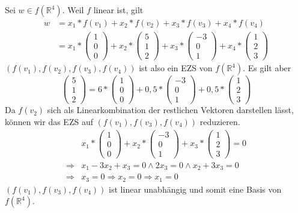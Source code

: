 \documentclass[a4paper,10pt]{article}
\begin{document}
Sei $w \in f(\mathbb{R}^4)$.
Weil $f$ linear ist, gilt
\begin{align}
 w & = x_1 * f(v_1) + x_2 * f(v_2) + x_3 * f(v_3) + x_4 * f(v_4)\\
 & =
   x_1 * \begin{pmatrix}1\\0\\0\end{pmatrix} +
   x_2 * \begin{pmatrix}5\\1\\2\end{pmatrix} +
   x_3 * \begin{pmatrix}-3\\0\\1\end{pmatrix} +
   x_4 * \begin{pmatrix}1\\2\\3\end{pmatrix}
\end{align}
$(f(v_1), f(v_2), f(v_3), f(v_4))$ ist also ein EZS von $f(\mathbb{R}^4)$.
Es gilt aber
\begin{equation}
 \begin{pmatrix}5\\1\\2\end{pmatrix} = 6 * \begin{pmatrix}1\\0\\0\end{pmatrix} + 0,5 * \begin{pmatrix}-3\\0\\1\end{pmatrix} + 0,5 * \begin{pmatrix}1\\2\\3\end{pmatrix}
\end{equation}
Da $f(v_2)$ sich als Linearkombination der restlichen Vektoren darstellen lässt, können wir das EZS auf $(f(v_1), f(v_3), f(v_4))$ reduzieren.
\begin{align*}
 & x_1 * \begin{pmatrix}1\\0\\0\end{pmatrix} + x_2 * \begin{pmatrix}-3\\0\\1\end{pmatrix} + x_3 * \begin{pmatrix}1\\2\\3\end{pmatrix} = 0\\
 \Rightarrow & x_1 - 3x_2 + x_3 = 0 \land 2x_3 = 0 \land x_2 + 3x_3 = 0\\
 \Rightarrow & x_3 = 0 \Rightarrow x_2 = 0 \Rightarrow x_1 = 0
\end{align*}
$(f(v_1), f(v_3), f(v_4))$ ist linear unabhängig und somit eine Basis von $f(\mathbb{R}^4)$.
\end{document}
